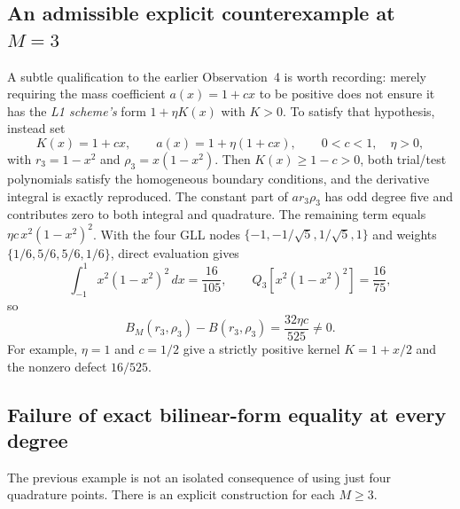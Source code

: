 \documentclass[11pt,a4paper]{amsart}
\theoremstyle{remark}
\theoremstyle{plain}
\theoremstyle{remark}
\numberwithin{equation}{section}
\begin{document}
\subsection{An admissible explicit counterexample at $M=3$}
A subtle qualification to the earlier Observation~4 is worth recording: merely requiring the mass coefficient $a(x)=1+cx$ to be positive does not ensure it has the \emph{L1 scheme's} form $1+\eta K(x)$ with $K>0$. To satisfy that hypothesis, instead set
\begin{equation}\label{eq:ob04-example}
 K(x)=1+cx,\qquad a(x)=1+\eta(1+cx),\qquad 0<c<1,\quad\eta>0,
\end{equation}
with $r_3=1-x^2$ and $\rho_3=x(1-x^2)$. Then $K(x)\ge1-c>0$, both trial/test polynomials satisfy the homogeneous boundary conditions, and the derivative integral is exactly reproduced. The constant part of $a r_3\rho_3$ has odd degree five and contributes zero to both integral and quadrature. The remaining term equals $\eta c\,x^2(1-x^2)^2$. With the four GLL nodes $\{-1,-1/\sqrt5,1/\sqrt5,1\}$ and weights $\{1/6,5/6,5/6,1/6\}$, direct evaluation gives
\begin{equation}\label{eq:ob04-m3}
 \int_{-1}^1 x^2(1-x^2)^2\,dx=\frac{16}{105},\qquad
 Q_3[x^2(1-x^2)^2]=\frac{16}{75},
\end{equation}
so
\begin{equation}\label{eq:ob04-m3-defect}
 B_M(r_3,\rho_3)-B(r_3,\rho_3)=\frac{32\eta c}{525}\ne0.
\end{equation}
For example, $\eta=1$ and $c=1/2$ give a strictly positive kernel $K=1+x/2$ and the nonzero defect $16/525$.

\subsection{Failure of exact bilinear-form equality at every degree}
The previous example is not an isolated consequence of using just four quadrature points. There is an explicit construction for each $M\ge3$.
\end{document}
